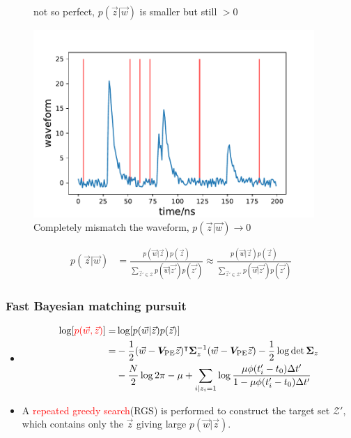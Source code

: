 \documentclass{beamer}
\begin{document}
\begin{CJK*}{UTF8}{gbsn}
\begin{frame}
\begin{minipage}[c]{0.33\textwidth}
\begin{figure}[H]
        \caption{not so perfect, $p(\vec{z}|\vec{w})$ is smaller but still $>0$}
        \label{fig:not so perfect PE}
    \end{figure}
\end{minipage}\begin{minipage}[c]{0.33\textwidth}
    \begin{figure}[H]
        \centering
            \includegraphics[width=0.95\textwidth]{img/nonsense_PE.pdf}
        \caption{Completely mismatch the waveform, $p(\vec{z}|\vec{w}) \rightarrow 0$}
        \label{fig:nonsense PE}
    \end{figure}
\end{minipage}
\begin{align*}
    p(\vec{z}|\vec{w}) &= \frac{p(\vec{w}|\vec{z})p(\vec{z})}{\sum_{\vec{z}'\in\mathcal{Z}}p(\vec{w}|\vec{z'})p(\vec{z'})} \approx \frac{p(\vec{w}|\vec{z})p(\vec{z})}{\sum_{\vec{z}'\in\mathcal{Z}'}p(\vec{w}|\vec{z'})p(\vec{z'})}
\end{align*}
\end{frame}

\begin{frame}
\frametitle{Fast Bayesian matching pursuit}
\begin{itemize}
    \item \begin{align*}
        \log[\textcolor{red}{p(\vec{w},\vec{z})}] =& \log[p(\vec{w}|\vec{z})p(\vec{z})] \\
        =& -\frac{1}{2}(\vec{w}-\bm{V}_\mathrm{PE}\vec{z})^\intercal\bm{\Sigma}_z^{-1}(\vec{w}-\bm{V}_\mathrm{PE}\vec{z})-\frac{1}{2}\log\det\bm{\Sigma}_z \\ 
        &-\frac{N}{2}\log2\pi -\mu + \sum_{i|z_i=1}\log \frac{\mu \phi(t'_i - t_0) \Delta t'}{1-\mu \phi(t'_i - t_0) \Delta t'}
        \end{align*}
    \item A \textcolor{red}{repeated greedy search}(RGS) is performed to construct the target set $\mathcal{Z}'$, which contains only the $\vec{z}$ giving large $p(\vec{w}|\vec{z})$. 
\end{itemize}
\end{frame}


\end{CJK*}
\end{document}
